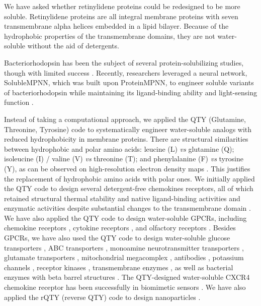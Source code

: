 \documentclass[fleqn, 10pt, lineno]{manuscript}
\begin{document}
We have asked whether retinylidene proteins could be redesigned to be more soluble. Retinylidene proteins are all integral membrane proteins with seven transmembrane alpha helices embedded in a lipid bilayer. Because of the hydrophobic properties of the transmembrane domains, they are not water-soluble without the aid of detergents. 

Bacteriorhodopsin has been the subject of several protein-solubilizing studies, though with limited success \citep{Qing_2022}. Recently, researchers leveraged a neural network, SolubleMPNN, which was built upon ProteinMPNN, to engineer soluble variants of bacteriorhodopsin while maintaining its ligand-binding ability and light-sensing function \citep{Nikolaev_2024}.

Instead of taking a computational approach, we applied the QTY (Glutamine, Threonine, Tyrosine) code to systematically engineer water-soluble analogs with reduced hydrophobicity in membrane proteins. There are structural similarities between hydrophobic and polar amino acids: leucine (L) \textit{vs} glutamine (Q); isoleucine (I) / valine (V) \textit{vs} threonine (T); and phenylalanine (F) \textit{vs} tyrosine (Y), as can be observed on high-resolution electron density maps \citep{Zhang_2018, Zhang_2022, Tegler_2020}. This justifies the replacement of hydrophobic amino acids with polar ones. We initially applied the QTY code to design several detergent-free chemokines receptors, all of which retained structural thermal stability and native ligand-binding activities and enzymatic activities despite substantial changes to the transmembrane domain \citep{Zhang_2018, Tegler_2020}. We have also applied the QTY code to design water-soluble GPCRs, including chemokine receptors \citep{Zhang_2018, Qing_2019, Tegler_2020, Skuhersky_2021}, cytokine receptors \citep{Hao_2020}, and olfactory receptors \citep{Skuhersky_2021, Johnsson_2025}. Besides GPCRs, we have also used the QTY code to design water-soluble glucose transporters \citep{Smorodina_2022}, ABC transporters \citep{Pan_2024}, monoamine neurotransmitter transporters \citep{Karagol_Karagol_Alper_2024}, glutamate transporters \citep{Karagol_Karagol_Smorodina_2024, Karagol_2024}, mitochondrial megacomplex \citep{Chen_2025}, antibodies \citep{Li_Wang_2024}, potassium channels \citep{Smorodina_2024}, receptor kinases \citep{Li_Tang_2024}, transmembrane enzymes \citep{Chen_Pan_2025}, as well as bacterial enzymes with beta barrel structures \citep{Sajeev-Sheeja_2023, Sajeev-Sheeja_2024}. The QTY-designed water-soluble CXCR4 chemokine receptor has been successfully in biomimetic sensors \citep{Qing_2023}. We have also applied the rQTY (reverse QTY) code to design nanoparticles \citep{Meng_2023}.
\end{document}
